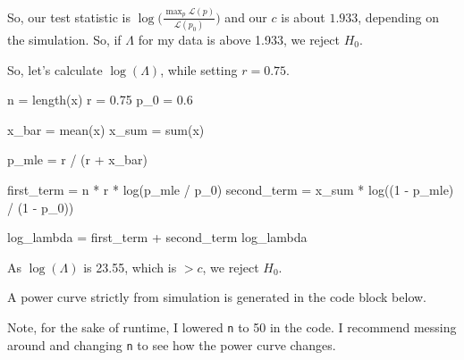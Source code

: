 \documentclass[
  letterpaper,
  DIV=11,
  numbers=noendperiod]{scrreprt}
\newenvironment{Shaded}{\begin{snugshade}}{\end{snugshade}}
\newcommand{\NormalTok}[1]{\textcolor[rgb]{0.00,0.23,0.31}{#1}}
\begin{document}
So, our test statistic is
\(\log \Big(\frac{\max_{p} \mathcal{L}(p)}{\mathcal{L}(p_0)} \Big)\) and
our \(c\) is about \(1.933\), depending on the simulation. So, if
\(\Lambda\) for my data is above 1.933, we reject \(H_0\).

So, let's calculate \(\log (\Lambda)\), while setting \(r=0.75\).

\begin{Shaded}
\begin{Highlighting}[]
\NormalTok{n = length(x)}
\NormalTok{r = 0.75}
\NormalTok{p\_0 = 0.6}

\NormalTok{x\_bar = mean(x)}
\NormalTok{x\_sum = sum(x)}
    
\NormalTok{p\_mle = r / (r + x\_bar)}
    
\NormalTok{first\_term = n * r * log(p\_mle / p\_0)}
\NormalTok{second\_term = x\_sum * log((1 {-} p\_mle) / (1 {-} p\_0))}
    
\NormalTok{log\_lambda = first\_term + second\_term}
\NormalTok{log\_lambda}
\end{Highlighting}
\end{Shaded}

As \(\log (\Lambda)\) is 23.55, which is \(>c\), we reject \(H_0\).

A power curve strictly from simulation is generated in the code block
below.

Note, for the sake of runtime, I lowered \texttt{n} to 50 in the code. I
recommend messing around and changing \texttt{n} to see how the power
curve changes.
\end{document}
